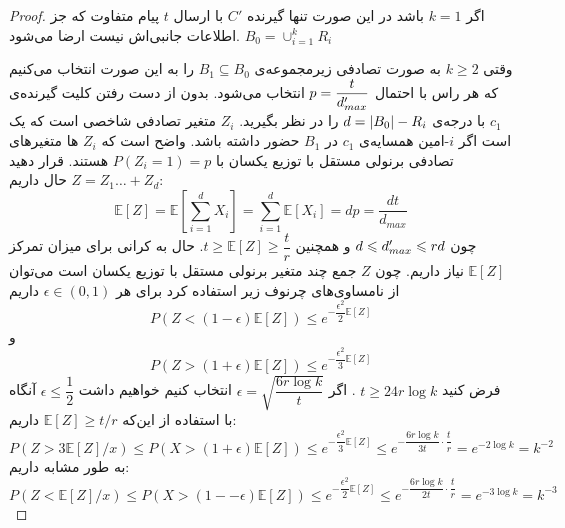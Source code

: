 \begin{proof}
	اگر
	$k = 1$
	باشد در این صورت تنها گیرنده
	$C'$
	با ارسال
	$t$
	پیام متفاوت که جز اطلاعات جانبی‌اش نیست ارضا می‌شود.
	$B_0 = \cup_{i = 1}^{k} R_i$
	
	وقتی
	$k \geq 2$
	به صورت تصادفی زیرمجموعه‌ی
	$B_1 \subseteq B_0$
	را به این صورت انتخاب می‌کنیم که هر راس با احتمال
	$p = \dfrac{t}{d_{max}'}$
	انتخاب می‌شود. بدون از دست رفتن کلیت گیرنده‌ی
	$c_1$
	با درجه‌ی
	$d = \left|{B_0}\right| - R_i$
	را در نظر بگیرید.
	$Z_i$
	متغیر تصادفی شاخصی است که یک است اگر
	$i$-امین همسایه‌ی
	$c_1$
	در
	$B_1$
	حضور داشته باشد. واضح است که
	$Z_i$
	ها متغیرهای تصادفی برنولی مستقل با توزیع یکسان با
	$P(Z_i = 1) = p$
	هستند. قرار دهید
	$Z = Z_1 \ldots + Z_d$
	حال داریم:
	\begin{equation}
		\mathbb{E}[Z] = \mathbb{E}[\sum\limits_{i = 1}^{d} X_i ] = \sum\limits_{i = 1}^{d} \mathbb{E}[X_i] = dp = \dfrac{dt}{d_{max}}
	\end{equation}
	چون
	$d \leqslant d_{max}' \leqslant rd$
	و همچنین
	$t \geq \mathbb{E}[Z] \geq \dfrac{t}{r}$.
	حال به کرانی برای میزان تمرکز
	$\mathbb{E}[Z]$
	نیاز داریم. چون
	$Z$
	جمع چند متغیر برنولی مستقل با توزیع یکسان است می‌توان از نامساوی‌های چرنوف زیر استفاده کرد
	\cite{Dubhashi_Panconesi_2009}
	برای هر
	$\epsilon \in (0, 1)$
	داریم
	$$P(Z < (1 - \epsilon) \mathbb{E}[Z]) \leq e^{- \dfrac{\epsilon^2}{2} \mathbb{E}[Z]}$$
	و
	$$P(Z > (1 + \epsilon) \mathbb{E}[Z]) \leq e^{- \dfrac{\epsilon^2}{3} \mathbb{E}[Z]}$$
	فرض کنید
	$t \geq 24 r \log k$
	. اگر
	$\epsilon = \sqrt{\dfrac{6r \log k}{t}}$
	انتخاب کنیم خواهیم داشت
	$\epsilon \leq \dfrac{1}{2}$
	آنگاه با استفاده از این‌که
	$\mathbb{E}[Z] \geq t/r$
	داریم:
	\begin{equation}
		P(Z > 3 \mathbb{E}[Z]/x) \leq P(X > (1 + \epsilon) \mathbb{E}[Z]) \leq e^{-\dfrac{\epsilon^2}{3} \mathbb{E}[Z]} \leq e^{- \dfrac{6 r \log k}{3 t} \cdot \dfrac{t}{r}} = e^{- 2 \log k} = k^{-2}
	\end{equation}
	به طور مشابه داریم:
	\begin{equation}
		P(Z < \mathbb{E}[Z]/x) \leq P(X > (1 -- \epsilon) \mathbb{E}[Z]) \leq e^{-\dfrac{\epsilon^2}{2} \mathbb{E}[Z]} \leq e^{- \dfrac{6 r \log k}{2 t} \cdot \dfrac{t}{r}} = e^{-3 \log k} = k^{-3}
	\end{equation}
	

\end{proof}
